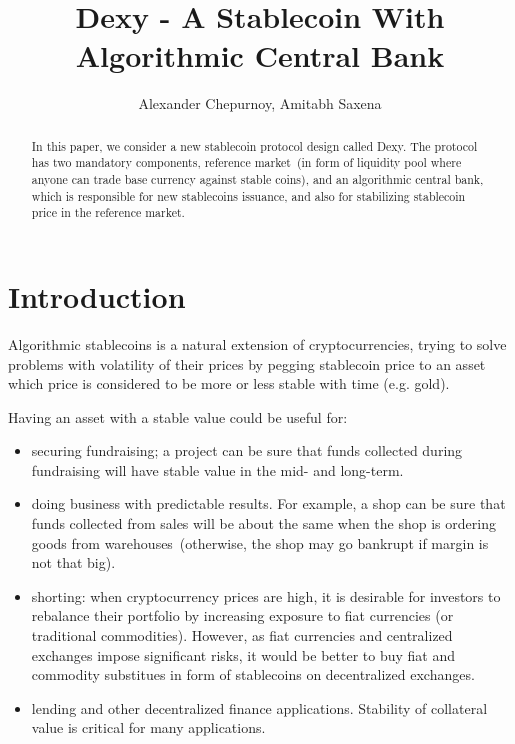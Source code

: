 \documentclass{article}   %
\newcommand{\dx}{Dexy}
\begin{document}
\title{Dexy - A Stablecoin With Algorithmic Central Bank}
\author{Alexander Chepurnoy, Amitabh Saxena}


\maketitle

\begin{abstract}
In this paper, we consider a new stablecoin protocol design called \dx. The protocol has two mandatory components, reference market~(in form of liquidity pool where anyone can 
trade base currency against stable coins), and an algorithmic central bank, which is responsible for new stablecoins issuance, and also for stabilizing stablecoin price in the reference market. 
\end{abstract}

% 

\section{Introduction}

Algorithmic stablecoins is a natural extension of cryptocurrencies, trying to 
solve problems with volatility of their prices by pegging stablecoin price to an
asset which price is considered to be more or less stable with time (e.g. gold).  

Having an asset with a stable value could be useful for:
\begin{itemize}
\item securing fundraising; a project can be sure that funds collected during fundraising will have stable value in the mid- and long-term.
\item doing business with predictable results. For example, a shop can be sure that funds collected from sales will be about the same when the shop is ordering goods from warehouses~(otherwise, the shop may go bankrupt if margin is not that big). 
\item shorting: when cryptocurrency prices are high, it is desirable for investors to rebalance their portfolio by increasing exposure to fiat currencies (or traditional
 commodities). However, as fiat currencies and centralized exchanges impose significant risks, it would be better to buy fiat and commodity substitues in form of stablecoins on decentralized exchanges.
\item lending and other decentralized finance applications. Stability of collateral value is critical for many applications.
\end{itemize}
\end{document}
